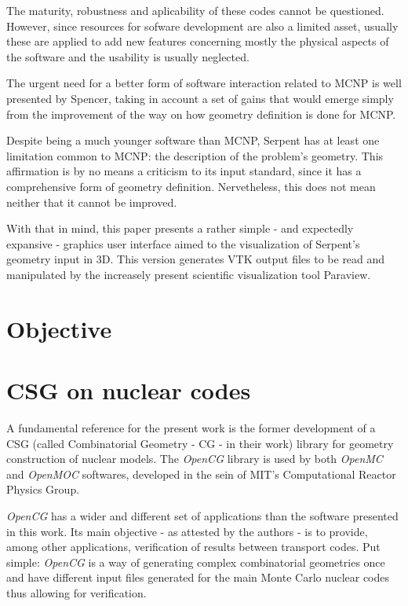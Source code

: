 \documentclass{elsarticle}
\begin{document}
The maturity, robustness and aplicability of these codes cannot be questioned.
However, since resources for sofware development are also a limited asset,
usually these are applied to add new features concerning mostly the physical aspects of the software and the usability is usually neglected.

The urgent need for a better form of software interaction related to MCNP
is well presented by Spencer\cite{Spencer2017}, taking in account a set of gains that would emerge simply from the improvement of the way on how geometry definition is done for MCNP.

Despite being a much younger software than MCNP, Serpent has at least one limitation common to MCNP: the description of the problem's geometry. This affirmation is by no means a criticism to its input standard, since it has a comprehensive form of geometry
definition. Nervetheless, this does not mean neither that it cannot be improved.

With that in mind, this paper presents a rather simple - and expectedly expansive -
graphics user interface aimed to the visualization of Serpent's geometry input
in 3D. This version generates VTK output files to be read and manipulated by
the increasely present scientific visualization tool Paraview\cite{paraview}.

\section{Objective}


\section{CSG on nuclear codes}

A fundamental reference for the present work is the former development of a CSG
(called Combinatorial Geometry - CG - in their work) library for geometry construction
of nuclear models. The \textit{OpenCG} library \cite{Boyd2015} is used by both
\textit{OpenMC}\cite{Romano2015} and \textit{OpenMOC}\cite{Boyd2014} softwares, developed in the sein
of MIT's Computational Reactor Physics Group.

\textit{OpenCG} has a wider and different set of applications than the
software presented in this work. Its main objective - as attested by the authors -
is to provide, among other applications, verification of results between transport
codes. Put simple: \textit{OpenCG} is a way of generating complex
combinatorial geometries once and have different input files generated for the main
Monte Carlo nuclear codes thus allowing for verification.
\end{document}

